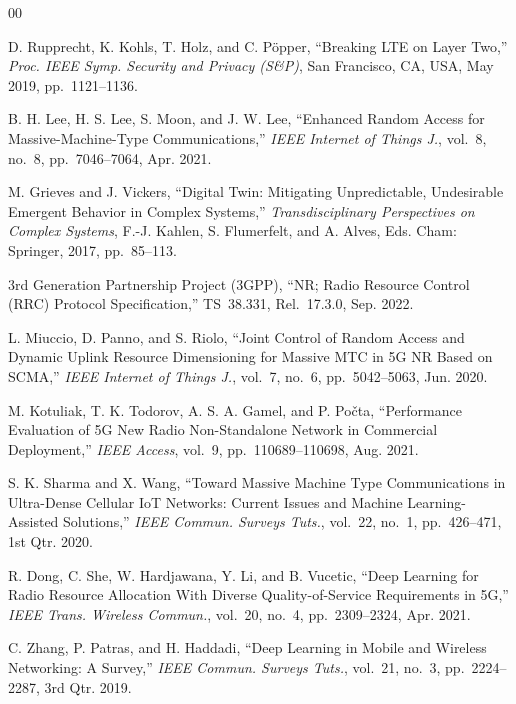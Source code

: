 \documentclass[conference]{IEEEtran}
\begin{document}
\begin{thebibliography}{00}

D. Rupprecht, K. Kohls, T. Holz, and C. Pöpper,
``Breaking LTE on Layer Two,''
\emph{Proc. IEEE Symp. Security and Privacy (S\&P)},
San Francisco, CA, USA, May 2019, pp.~1121--1136.

B. H. Lee, H. S. Lee, S. Moon, and J. W. Lee,
``Enhanced Random Access for Massive-Machine-Type Communications,''
\emph{IEEE Internet of Things J.},
vol.~8, no.~8, pp.~7046--7064, Apr. 2021.

M. Grieves and J. Vickers,
``Digital Twin: Mitigating Unpredictable, Undesirable Emergent Behavior in
Complex Systems,''
\emph{Transdisciplinary Perspectives on Complex Systems},
F.-J. Kahlen, S. Flumerfelt, and A. Alves, Eds.
Cham: Springer, 2017, pp.~85--113.

3rd Generation Partnership Project (3GPP),
``NR; Radio Resource Control (RRC) Protocol Specification,''
TS~38.331, Rel.~17.3.0, Sep. 2022.

L. Miuccio, D. Panno, and S. Riolo,
``Joint Control of Random Access and Dynamic Uplink Resource Dimensioning
for Massive MTC in 5G NR Based on SCMA,''
\emph{IEEE Internet of Things J.},
vol.~7, no.~6, pp.~5042--5063, Jun. 2020.

M. Kotuliak, T. K. Todorov, A. S. A. Gamel, and P. Počta,
``Performance Evaluation of 5G New Radio Non-Standalone Network in Commercial Deployment,''
\emph{IEEE Access},
vol.~9, pp.~110689--110698, Aug. 2021.

S. K. Sharma and X. Wang,
``Toward Massive Machine Type Communications in Ultra-Dense Cellular IoT
Networks: Current Issues and Machine Learning-Assisted Solutions,''
\emph{IEEE Commun. Surveys Tuts.},
vol.~22, no.~1, pp.~426--471, 1st Qtr. 2020.

R. Dong, C. She, W. Hardjawana, Y. Li, and B. Vucetic,
``Deep Learning for Radio Resource Allocation With Diverse Quality-of-Service
Requirements in 5G,''
\emph{IEEE Trans. Wireless Commun.},
vol.~20, no.~4, pp.~2309--2324, Apr. 2021.

C. Zhang, P. Patras, and H. Haddadi,
``Deep Learning in Mobile and Wireless Networking: A Survey,''
\emph{IEEE Commun. Surveys Tuts.},
vol.~21, no.~3, pp.~2224--2287, 3rd Qtr. 2019.


\end{thebibliography}
\end{document}
